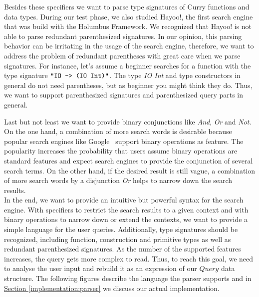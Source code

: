 \documentclass[%
	latex,%
	a4paper,%
	oneside,%
	chapterprefix,%
	headsepline,%
	12pt%
]{scrbook}
\newcommand{\Conid}[1]{\mathit{#1}}
\begin{document}
Besides these specifiers we want to parse type signatures of Curry
functions and data types. %
During our test phase, we also studied Hayoo!, the first search engine
that was build with the Holumbus Framework. %
We recognized that Hayoo! is not able to parse redundant parenthesized
signatures.  In our opinion, this parsing behavior can be irritating
in the usage of the search engine, therefore, we want to address the
problem of redundant parentheses with great care when we parse
signatures. %
For instance, let's assume a beginner searches for a function with the
type signature \ensuremath{\text{\tt \char34 IO~->~(IO~Int)\char34}}. %
The type \emph{IO Int} and type constructors in general do not need
parentheses, but as beginner you might think they do. %
Thus, we want to support parenthesized signatures and parenthesized
query parts in general. %

Last but not least we want to provide binary conjunctions like
\emph{And}, \emph{Or} and \emph{Not}. %
On the one hand, a combination of more search words is desirable
because popular search engines like Google\texttrademark~ support
binary operations as feature. %
The popularity increases the probability that users assume binary
operations are standard features and expect search engines to provide
the conjunction of several search terms. %
On the other hand, if the desired result is still vague, a combination
of more search words by a disjunction \emph{Or} helps to narrow down
the search results.\\

In the end, we want to provide an intuitive but powerful syntax for
the search engine. %
With specifiers to restrict the search results to a given context and
with binary operations to narrow down or extend the contexts, we want
to provide a simple language for the user queries. %
Additionally, type signatures should be recognized, including
function, construction and primitive types as well as redundant
parenthesized signatures. %
As the number of the supported features increases, the query gets more
complex to read. %
Thus, to reach this goal, we need to analyse the user input and
rebuild it as an expression of our \ensuremath{\Conid{Query}} data structure. %
The following figures describe the language the parser supports and in
\hyperref[implementation:parser]{Section \ref{implementation:parser}}
we discuss our actual implementation. %
\end{document}
